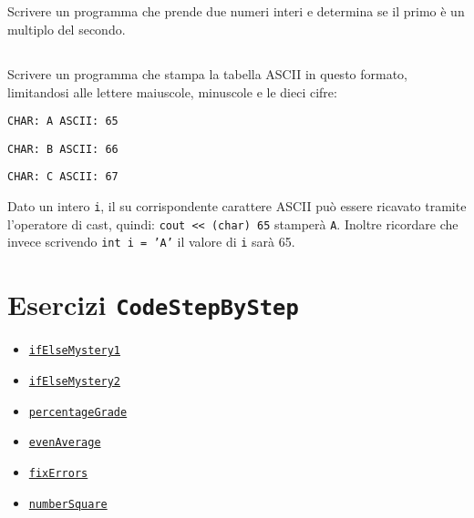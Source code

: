 \documentclass{article}
\begin{document}
\subsection{}
Scrivere un programma che prende due numeri interi e determina se il primo è un multiplo del secondo.

\subsection{}
Scrivere un programma che stampa la tabella ASCII in questo formato, limitandosi alle lettere maiuscole, minuscole e le dieci cifre:

\texttt{CHAR: A ASCII: 65}

\texttt{CHAR: B ASCII: 66}

\texttt{CHAR: C ASCII: 67}


\begin{info}
	Dato un intero \texttt{i}, il su corrispondente carattere ASCII può essere ricavato tramite l'operatore di cast, quindi:
	\texttt{cout {<}< (char) 65} stamperà \texttt{A}. 
	Inoltre ricordare che invece scrivendo \texttt{int i = 'A'} il valore di \texttt{i} sarà 65. 
\end{info}


\section*{Esercizi \texttt{CodeStepByStep}}
\begin{itemize}
	\item \href{https://www.codestepbystep.com/problem/view/cpp/ifelse/ifElseMystery1}{\texttt{ifElseMystery1}}
	\item \href{https://www.codestepbystep.com/problem/view/cpp/ifelse/ifElseMystery2}{\texttt{ifElseMystery2}}
	\item \href{https://www.codestepbystep.com/problem/view/cpp/ifelse/percentageGrade}{\texttt{percentageGrade}}
	\item \href{https://www.codestepbystep.com/problem/view/cpp/basics/evenAverage}{\texttt{evenAverage}}
	\item \href{https://www.codestepbystep.com/problem/view/cpp/basics/fixErrors}{\texttt{fixErrors}}
	\item \href{https://www.codestepbystep.com/problem/view/cpp/basics/numberSquare}{\texttt{numberSquare}}
\end{itemize}
\end{document}
